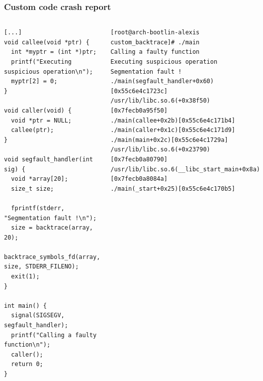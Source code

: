 \begin{frame}[fragile]
  \frametitle{Custom code crash report}
  \begin{columns}
    \begin{block}{}
      \begin{verbatim}
[...]
void callee(void *ptr) {
  int *myptr = (int *)ptr;
  printf("Executing suspicious operation\n");
  myptr[2] = 0;
}

void caller(void) {
  void *ptr = NULL;
  callee(ptr);
}

void segfault_handler(int sig) {
  void *array[20];
  size_t size;

  fprintf(stderr, "Segmentation fault !\n");
  size = backtrace(array, 20);
  backtrace_symbols_fd(array, size, STDERR_FILENO);
  exit(1);
}

int main() {
  signal(SIGSEGV, segfault_handler);
  printf("Calling a faulty function\n");
  caller();
  return 0;
}
      \end{verbatim}
    \end{block}
    \begin{block}{}
      \begin{verbatim}
[root@arch-bootlin-alexis custom_backtrace]# ./main
Calling a faulty function
Executing suspicious operation
Segmentation fault !
./main(segfault_handler+0x60)[0x55c6e4c1723c]
/usr/lib/libc.so.6(+0x38f50)[0x7fecb0a95f50]
./main(callee+0x2b)[0x55c6e4c171b4]
./main(caller+0x1c)[0x55c6e4c171d9]
./main(main+0x2c)[0x55c6e4c1729a]
/usr/lib/libc.so.6(+0x23790)[0x7fecb0a80790]
/usr/lib/libc.so.6(__libc_start_main+0x8a)[0x7fecb0a8084a]
./main(_start+0x25)[0x55c6e4c170b5]
      \end{verbatim}
    \end{block}
  \end{columns}
\end{frame}



